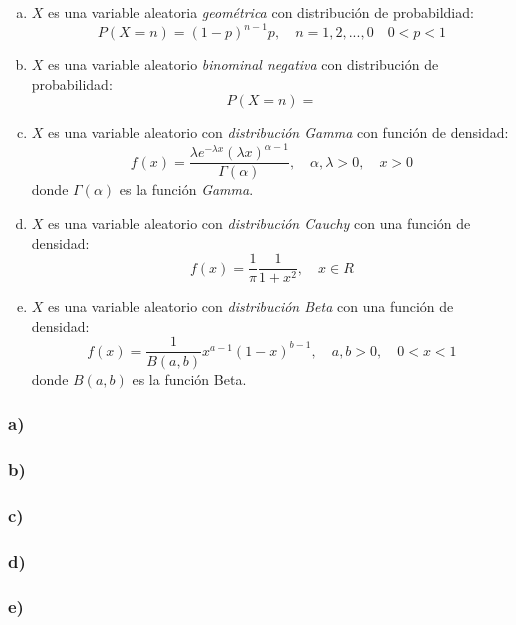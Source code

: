 \documentclass{article}
\begin{document}
\begin{enumerate}[a)]
    \item $X$ es una variable aleatoria \textit{geométrica} con distribución de probabildiad:
    \[ P (X = n) = (1-p)^{n-1}p, \quad n = 1,2,...,0 \quad 0<p<1 \]
    \item $X$ es una variable aleatorio \textit{binominal negativa} con distribución de probabilidad:
    \[ P (X = n) =  \]
    \item $X$ es una variable aleatorio con \textit{distribución Gamma} con función de densidad:
    \[ f(x) = \frac{\lambda e^{-\lambda x}(\lambda x)^{\alpha-1}}{\Gamma(\alpha)}, \quad \alpha,\lambda > 0, \quad x>0 \]
    donde $\Gamma(\alpha)$ es la función \textit{Gamma}.
    \item $X$ es una variable aleatorio con \textit{distribución Cauchy} con una función de densidad:
    \[ f(x) = \frac{1}{\pi} \frac{1}{1+x^2}, \quad x \in R \]
    \item $X$ es una variable aleatorio con \textit{distribución Beta} con una función de densidad:
    \[ f(x) = \frac{1}{B(a,b)}x^{a-1}(1-x)^{b-1}, \quad a,b>0, \quad 0<x<1 \]
    donde $B(a,b)$ es la función Beta.
\end{enumerate}
\begin{tcolorbox}[breakable]
    \subsubsection*{a)}

    \subsubsection*{b)}
    
    \subsubsection*{c)}
    
    \subsubsection*{d)}
    
    \subsubsection*{e)}
\end{tcolorbox}
\end{document}
